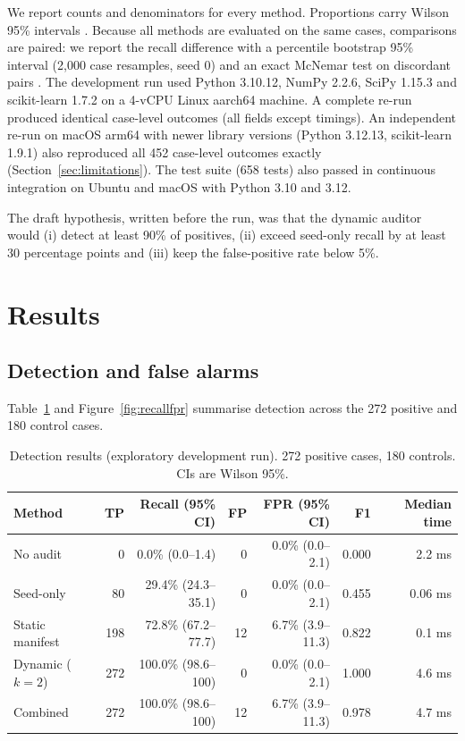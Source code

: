 \documentclass[11pt]{article}
\begin{document}
We report counts and denominators for every method. Proportions carry Wilson 95\% intervals \citep{wilson1927probable}. Because all methods are evaluated on the same cases, comparisons are paired: we report the recall difference with a percentile bootstrap 95\% interval (2{,}000 case resamples, seed 0) and an exact McNemar test on discordant pairs \citep{mcnemar1947note}. The development run used Python 3.10.12, NumPy 2.2.6, SciPy 1.15.3 and scikit-learn 1.7.2 on a 4-vCPU Linux aarch64 machine. A complete re-run produced identical case-level outcomes (all fields except timings). An independent re-run on macOS arm64 with newer library versions (Python 3.12.13, scikit-learn 1.9.1) also reproduced all 452 case-level outcomes exactly (Section~\ref{sec:limitations}). The test suite (658 tests) also passed in continuous integration on Ubuntu and macOS with Python 3.10 and 3.12.

The draft hypothesis, written before the run, was that the dynamic auditor would (i) detect at least 90\% of positives, (ii) exceed seed-only recall by at least 30 percentage points and (iii) keep the false-positive rate below 5\%.

\section{Results}
\label{sec:results}

\subsection{Detection and false alarms}

Table~\ref{tab:results} and Figure~\ref{fig:recallfpr} summarise detection across the 272 positive and 180 control cases.

\begin{table}[t]
\centering\small
\caption{Detection results (exploratory development run). 272 positive cases, 180 controls. CIs are Wilson 95\%.}
\label{tab:results}
\begin{tabular}{lrrrrrr}
\toprule
Method & TP & Recall (95\% CI) & FP & FPR (95\% CI) & F1 & Median time \\
\midrule
No audit & 0 & 0.0\% (0.0--1.4) & 0 & 0.0\% (0.0--2.1) & 0.000 & 2.2 ms \\
Seed-only & 80 & 29.4\% (24.3--35.1) & 0 & 0.0\% (0.0--2.1) & 0.455 & 0.06 ms \\
Static manifest & 198 & 72.8\% (67.2--77.7) & 12 & 6.7\% (3.9--11.3) & 0.822 & 0.1 ms \\
Dynamic ($k=2$) & 272 & 100.0\% (98.6--100) & 0 & 0.0\% (0.0--2.1) & 1.000 & 4.6 ms \\
Combined & 272 & 100.0\% (98.6--100) & 12 & 6.7\% (3.9--11.3) & 0.978 & 4.7 ms \\
\bottomrule
\end{tabular}
\end{table}
\end{document}
